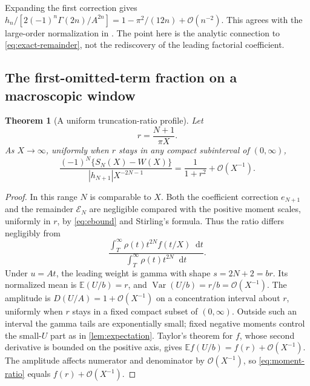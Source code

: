 \documentclass[11pt,a4paper]{article}
\newtheorem{theorem}{Theorem}[section]
\theoremstyle{definition}
\numberwithin{equation}{section}
\newcommand{\dd}{\mathop{}\!\mathrm{d}}
\newcommand{\Oh}{\mathcal O}
\newcommand{\E}{\mathbb E}
\newcommand{\ctail}{\mathcal E}
\begin{document}
Expanding the first correction gives
$h_n/[2(-1)^n\Gamma(2n)/A^{2n}]=1-\pi^2/(12n)+\Oh(n^{-2})$.
This agrees with the large-order normalization in \cite{prior}.
The point here is the analytic connection to \eqref{eq:exact-remainder},
not the rediscovery of the leading factorial coefficient.

\subsection{The first-omitted-term fraction on a macroscopic window}
\begin{theorem}[A uniform truncation-ratio profile]
\label{thm:macro}
Let
\begin{equation}
 r=\frac{N+1}{\pi X}.
 \label{eq:r}
\end{equation}
As $X\to\infty$, uniformly when $r$ stays in any compact subinterval of
$(0,\infty)$,
\begin{equation}
 \frac{(-1)^N\{S_N(X)-W(X)\}}
      {|h_{N+1}|X^{-2N-1}}
       =\frac1{1+r^2}+\Oh(X^{-1}).
 \label{eq:macro}
\end{equation}
\end{theorem}
\begin{proof}
In this range $N$ is comparable to $X$. Both the coefficient correction
$e_{N+1}$ and the remainder $\ctail_N$ are negligible compared with the
positive moment scales, uniformly in $r$, by \eqref{eq:ebound} and
Stirling's formula. Thus the ratio differs negligibly from
\begin{equation}
 \frac{\int_T^\infty\rho(t)t^{2N}f(t/X)\dd t}
      {\int_T^\infty\rho(t)t^{2N}\dd t}.
 \label{eq:moment-ratio}
\end{equation}
Under $u=At$, the leading weight is gamma with shape
$s=2N+2=br$. Its normalized mean is $\E(U/b)=r$, and
$\operatorname{Var}(U/b)=r/b=\Oh(X^{-1})$. The amplitude is
$D(U/A)=1+\Oh(X^{-1})$ on a concentration interval about $r$, uniformly
when $r$ stays in a fixed compact subset of $(0,\infty)$. Outside such
an interval the gamma tails are exponentially small; fixed negative
moments control the small-$U$ part as in \cref{lem:expectation}.
Taylor's theorem for $f$, whose second derivative is bounded on the
positive axis, gives $\E f(U/b)=f(r)+\Oh(X^{-1})$.
The amplitude affects numerator and denominator by $\Oh(X^{-1})$,
so \eqref{eq:moment-ratio} equals $f(r)+\Oh(X^{-1})$.
\end{proof}
\end{document}
